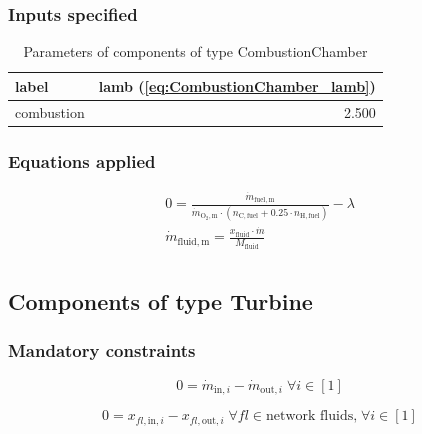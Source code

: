 \subsubsection{Inputs specified}

\begin{table}[H]\begin{center}
\begin{tabular}{lr}
\toprule
      label &  lamb (\ref{eq:CombustionChamber_lamb}) \\
\midrule
 combustion &                                   2.500 \\
\bottomrule
\end{tabular}
\caption{Parameters of components of type CombustionChamber}
\end{center}\end{table}

\subsubsection{Equations applied}

\begin{equation}
\label{eq:CombustionChamber_lamb}
\begin{split}
0 = \frac{\dot{m}_\mathrm{fuel,m}}{\dot{m}_\mathrm{O_2,m} \cdot \left(n_\mathrm{C,fuel} + 0.25 \cdot n_\mathrm{H,fuel}\right)} - \lambda \\
\dot{m}_\mathrm{fluid,m} = \frac{x_\mathrm{fluid} \cdot \dot{m}}{M_\mathrm{fluid}}\\
\end{split}
\end{equation}


\subsection{Components of type Turbine}

\subsubsection{Mandatory constraints}

\begin{equation}
\label{eq:Turbine_mass_flow_constraints}
0=\dot{m}_{\mathrm{in,}i}-\dot{m}_{\mathrm{out,}i}\; \forall i \in [1]
\end{equation}

\begin{equation}
\label{eq:Turbine_fluid_constraints}
0=x_{fl\mathrm{,in,}i}-x_{fl\mathrm{,out,}i}\;\forall fl \in\text{network fluids,}\; \forall i \in [1]
\end{equation}


